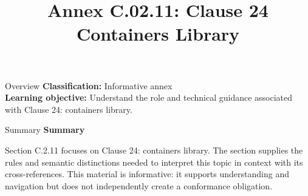 \documentclass[10pt,letterpaper]{article}
\title{Annex C.02.11: Clause 24 Containers Library}
\author{}
\date{}
\begin{document}
\maketitle
\begin{CornellOverviewBox}{Overview}
\textbf{Classification:} Informative annex\\[2pt]
\textbf{Learning objective:} Understand the role and technical guidance associated with Clause 24: containers library.
\end{CornellOverviewBox}\begin{CornellSummaryBox}{Summary}
{\sffamily\bfseries\color{Accent} Summary}\par\vspace{3pt}Section C.2.11 focuses on Clause 24: containers library. The section supplies the rules and semantic distinctions needed to interpret this topic in context with its cross-references. This material is informative: it supports understanding and navigation but does not independently create a conformance obligation.
\end{CornellSummaryBox}
\end{document}
